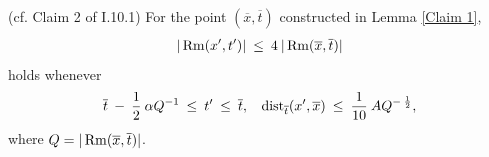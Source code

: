 \begin{lemma}
  \label{lem:kl-getting-parabolic-regions-getting-parabolic-regions-lemma}
 (cf. Claim 2 of I.10.1) \label{Claim 2}
For the point $(\overline{x}, \overline{t})$ constructed in Lemma \ref{Claim 1},
\begin{equation} \label{I.(10.1a)}
|\operatorname{Rm}(x^\prime,t^\prime)| \: \le \: 4 \: |\operatorname{Rm}(\overline{x}, \overline{t})|
\end{equation}
holds whenever
\begin{equation} \label{I.(10.3)}
\overline{t} \: - \: \frac12 \: \alpha Q^{-1} \: \le \:
t^\prime \: \le \: \overline{t},
\: \: \: \:
\operatorname{dist}_{\overline{t}}(x^\prime, \overline{x}) \: \le \: \frac{1}{10} \: A Q^{- \: \frac12},
\end{equation}
where $Q = |\operatorname{Rm}(\overline{x}, \overline{t})|$.
\end{lemma}
